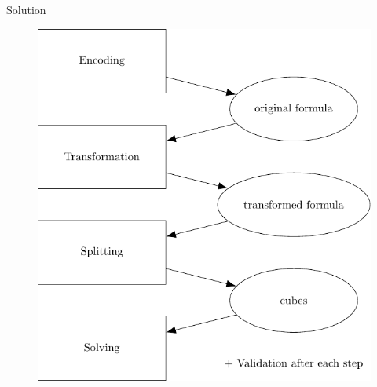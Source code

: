 \documentclass[c,8pt,xcolor...,x11names,usenames,dvipsnames]{beamer}
\begin{document}
\begin{frame}{Solution}
\begin{figure}
	\includegraphics[scale=0.65]{images/framework}
\end{figure}
\end{frame}
\end{document}
